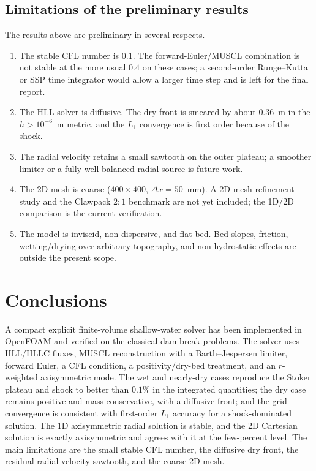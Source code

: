 ﻿\documentclass[11pt,a4paper]{article}
\newcommand{\dx}{\Delta x}
\begin{document}
\subsection{Limitations of the preliminary results}
The results above are preliminary in several respects.
\begin{enumerate}[leftmargin=1.4em,itemsep=1pt,topsep=2pt]
\item The stable CFL number is $0.1$.  The forward-Euler/MUSCL combination is
      not stable at the more usual $0.4$ on these cases; a second-order
      Runge--Kutta or SSP time integrator would allow a larger time step and is
      left for the final report.
\item The HLL solver is diffusive.  The dry front is smeared by about
      $0.36$~m in the $h>10^{-6}$~m metric, and the $L_1$ convergence is
      first order because of the shock.
\item The radial velocity retains a small sawtooth on the outer plateau; a
      smoother limiter or a fully well-balanced radial source is future work.
\item The 2D mesh is coarse ($400\times400$, $\dx=50$~mm).  A 2D mesh
      refinement study and the Clawpack $2:1$ benchmark are not yet included;
      the 1D/2D comparison is the current verification.
\item The model is inviscid, non-dispersive, and flat-bed.  Bed slopes,
      friction, wetting/drying over arbitrary topography, and non-hydrostatic
      effects are outside the present scope.
\end{enumerate}

\section{Conclusions}
\label{sec:conclusions}

A compact explicit finite-volume shallow-water solver has been implemented in
OpenFOAM and verified on the classical dam-break problems.  The solver uses
HLL/HLLC fluxes, MUSCL reconstruction with a Barth--Jespersen limiter, forward
Euler, a CFL condition, a positivity/dry-bed treatment, and an $r$-weighted
axisymmetric mode.  The wet and nearly-dry cases reproduce the Stoker plateau
and shock to better than $0.1\%$ in the integrated quantities; the dry case
remains positive and mass-conservative, with a diffusive front; and the grid
convergence is consistent with first-order $L_1$ accuracy for a shock-dominated
solution.  The 1D axisymmetric radial solution is stable, and the 2D Cartesian
solution is exactly axisymmetric and agrees with it at the few-percent level.
The main limitations are the small stable CFL number, the diffusive dry front,
the residual radial-velocity sawtooth, and the coarse 2D mesh.
\end{document}
